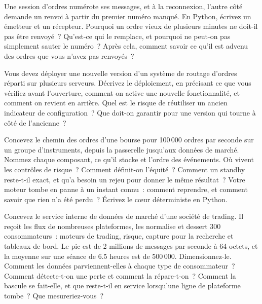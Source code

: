 \begin{question}\label{iq:iv3:system-design:36}
Une session d'ordres numérote ses messages, et à la reconnexion, l'autre côté demande un renvoi à partir du premier numéro manqué. En Python, écrivez un émetteur et un récepteur. Pourquoi un ordre vieux de plusieurs minutes ne doit-il pas être renvoyé~? Qu'est-ce qui le remplace, et pourquoi ne peut-on pas simplement sauter le numéro~? Après cela, comment savoir ce qu'il est advenu des ordres que vous n'avez pas renvoyés~?
\end{question}

\begin{question}\label{iq:iv3:system-design:37}
Vous devez déployer une nouvelle version d'un système de routage d'ordres réparti sur plusieurs serveurs. Décrivez le déploiement, en précisant ce que vous vérifiez avant l'ouverture, comment on active une nouvelle fonctionnalité, et comment on revient en arrière. Quel est le risque de réutiliser un ancien indicateur de configuration~? Que doit-on garantir pour une version qui tourne à côté de l'ancienne~?
\end{question}

\begin{question}\label{iq:iv3:system-design:38}
Concevez le chemin des ordres d'une bourse pour 100\,000 ordres par seconde sur un groupe d'instruments, depuis la passerelle jusqu'aux données de marché. Nommez chaque composant, ce qu'il stocke et l'ordre des événements. Où vivent les contrôles de risque~? Comment définit-on l'équité~? Comment un standby reste-t-il exact, et qu'a besoin un rejeu pour donner le même résultat~? Votre moteur tombe en panne à un instant connu~: comment reprendre, et comment savoir que rien n'a été perdu~? Écrivez le cœur déterministe en Python.
\end{question}

\begin{question}\label{iq:iv3:system-design:39}
Concevez le service interne de données de marché d'une société de trading. Il reçoit les flux de nombreuses plateformes, les normalise et dessert 300 consommateurs~: moteurs de trading, risque, capture pour la recherche et tableaux de bord. Le pic est de 2 millions de messages par seconde à 64 octets, et la moyenne sur une séance de 6.5 heures est de 500\,000. Dimensionnez-le. Comment les données parviennent-elles à chaque type de consommateur~? Comment détecte-t-on une perte et comment la répare-t-on~? Comment la bascule se fait-elle, et que reste-t-il en service lorsqu'une ligne de plateforme tombe~? Que mesureriez-vous~?
\end{question}

